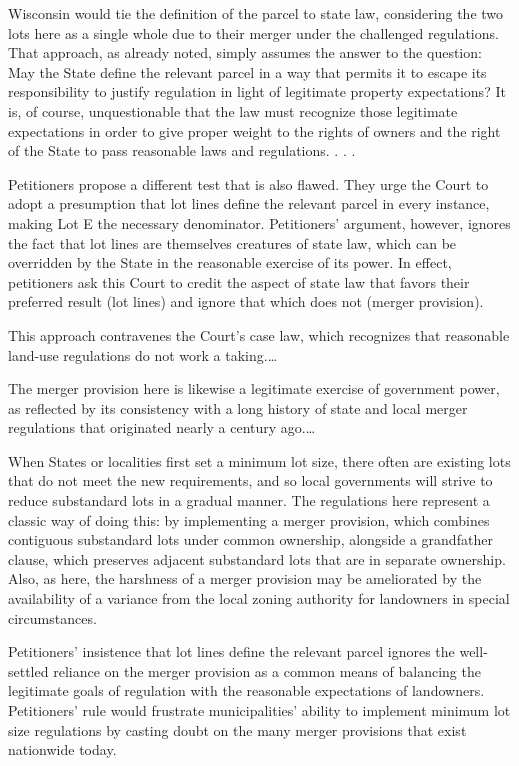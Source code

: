 Wisconsin would tie the definition of the parcel to state law, considering the
two lots here as a single whole due to their merger under the challenged
regulations. That approach, as already noted, simply assumes the answer to the
question: May the State define the relevant parcel in a way that permits it to
escape its responsibility to justify regulation in light of legitimate property
expectations? It is, of course, unquestionable that the law must recognize those
legitimate expectations in order to give proper weight to the rights of owners
and the right of the State to pass reasonable laws and regulations. . . . ~

Petitioners propose a different test that is also flawed. They urge the Court to
adopt a presumption that lot lines define the relevant parcel in every instance,
making Lot E the necessary denominator. Petitioners' argument, however, ignores
the fact that lot lines are themselves creatures of state law, which can be
overridden by the State in the reasonable exercise of its power. In effect,
petitioners ask this Court to credit the aspect of state law that favors their
preferred result (lot lines) and ignore that which does not (merger provision).

This approach contravenes the Court's case law, which recognizes that reasonable
land-use regulations do not work a taking.\ldots

The merger provision here is likewise a legitimate exercise of government power,
as reflected by its consistency with a long history of state and local merger
regulations that originated nearly a century ago.\ldots

When States or localities first set a minimum lot size, there often are existing
lots that do not meet the new requirements, and so local governments will strive
to reduce substandard lots in a gradual manner. The regulations here represent a
classic way of doing this: by implementing a merger provision, which combines
contiguous substandard lots under common ownership, alongside a grandfather
clause, which preserves adjacent substandard lots that are in separate
ownership. Also, as here, the harshness of a merger provision may be ameliorated
by the availability of a variance from the local zoning authority for landowners
in special circumstances. 

Petitioners' insistence that lot lines define the relevant parcel ignores the
well-settled reliance on the merger provision as a common means of balancing the
legitimate goals of regulation with the reasonable expectations of landowners.
Petitioners' rule would frustrate municipalities' ability to implement minimum
lot size regulations by casting doubt on the many merger provisions that exist
nationwide today. 

